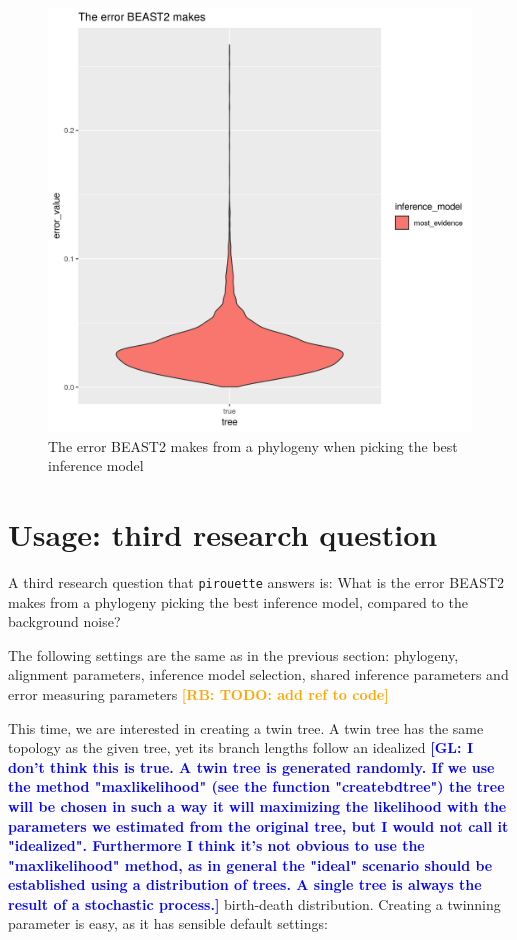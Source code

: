\documentclass{article}
\newcommand{\giovanni}[1]{\textcolor{blue}{\textbf{[GL: #1]}}}
\newcommand{\richel}[1]{\textcolor{orange}{\textbf{[RB: #1]}}}
\begin{document}
\begin{figure}[h]
  \includegraphics[width=\textwidth]{figure_3.png}
  \caption{
    The error BEAST2 makes from a phylogeny when
    picking the best inference model
  }
\end{figure}

\section{Usage: third research question}

A third research question that \verb;pirouette; answers is:
What is the error BEAST2 makes from a phylogeny 
picking the best inference model, compared to the background noise?

The following settings are the same as in the previous section:
phylogeny, alignment parameters, inference model selection,
shared inference parameters and error measuring parameters 
\richel{TODO: add ref to code}

This time, we are interested in creating a twin tree. A twin tree
has the same topology as the given tree, yet its branch lengths follow
an idealized \giovanni{I don't think this is true. A twin tree is generated randomly. If we use the method "maxlikelihood" (see the function "createbdtree") the tree will be chosen in such a way it will maximizing the likelihood with the parameters we estimated from the original tree, but I would not call it "idealized". Furthermore I think it's not obvious to use the "maxlikelihood" method, as in general the "ideal" scenario should be established using a distribution of trees. A single tree is always the result of a stochastic process.} birth-death distribution. Creating a twinning parameter is easy,
as it has sensible default settings:
\end{document}
